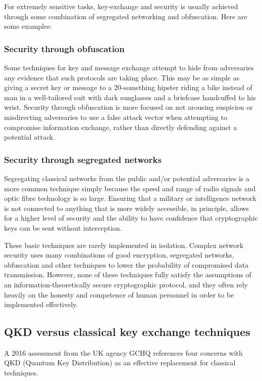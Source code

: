 \documentclass[twocolumn, aps, rmp, amsmath, amssymb, nofootinbib, superscriptaddress, longbibliography, floatfix, table-of-contents, eqsecnum]{revtex4-2}
\begin{document}
For extremely sensitive tasks, key-exchange and security is usually achieved through some combination of segregated networking and obfuscation. Here are some examples: 

\subsubsection{Security through obfuscation}

Some techniques for key and message exchange attempt to hide from adversaries any evidence that such protocols are taking place. This may be as simple as giving a secret key or message to a 20-something hipster riding a bike instead of man in a well-tailored suit with dark sunglasses and a briefcase handcuffed to his wrist. Security through obfuscation is more focused on not arousing suspicion or misdirecting adversaries to use a false attack vector when attempting to compromise information exchange, rather than directly defending against a potential attack. 

\subsubsection{Security through segregated networks}

Segregating classical networks from the public and/or potential adversaries is a more common technique simply because the speed and range of radio signals and optic fibre technology is so large. Ensuring that a military or intelligence network is not connected to anything that is more widely accessible, in principle, allows for a higher level of security and the ability to have confidence that cryptographic keys can be sent without interception.  

These basic techniques are rarely implemented in isolation. Complex network security uses many combinations of good encryption, segregated networks, obfuscation and other techniques to lower the probability of compromised data transmission. However, none of these techniques fully satisfy the assumptions of an information-theoretically secure cryptographic protocol, and they often rely heavily on the honesty and competence of human personnel in order to be implemented effectively. 

\subsection{QKD versus classical key exchange techniques}

A 2016 assessment from the UK agency GCHQ references four concerns with QKD (Quantum Key Distribution) as an effective replacement for classical techniques. 
\end{document}
